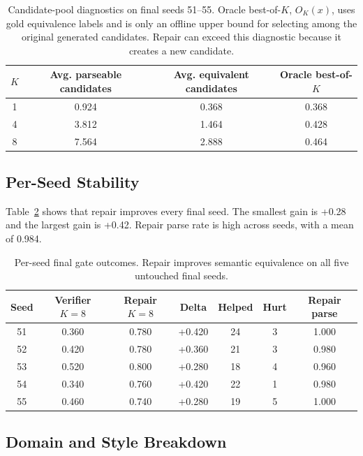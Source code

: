 \documentclass[11pt]{article}
\begin{document}
\begin{table}[t]
\centering
\small
\begin{tabular}{cccc}
\toprule
$K$ & Avg. parseable candidates & Avg. equivalent candidates & Oracle best-of-$K$ \\
\midrule
1 & 0.924 & 0.368 & 0.368 \\
4 & 3.812 & 1.464 & 0.428 \\
8 & 7.564 & 2.888 & 0.464 \\
\bottomrule
\end{tabular}
\caption{Candidate-pool diagnostics on final seeds 51--55. Oracle best-of-$K$,
\(O_K(x)\), uses gold equivalence labels and is only an offline upper bound for
selecting among the original generated candidates. Repair can exceed this
diagnostic because it creates a new candidate.}
\label{tab:oracle}
\end{table}

\subsection{Per-Seed Stability}

Table~\ref{tab:perseed} shows that repair improves every final seed. The
smallest gain is +0.28 and the largest gain is +0.42. Repair parse rate is high
across seeds, with a mean of 0.984.

\begin{table}[t]
\centering
\small
\begin{tabular}{ccccccc}
\toprule
Seed & Verifier $K=8$ & Repair $K=8$ & Delta & Helped & Hurt & Repair parse \\
\midrule
51 & 0.360 & 0.780 & +0.420 & 24 & 3 & 1.000 \\
52 & 0.420 & 0.780 & +0.360 & 21 & 3 & 0.980 \\
53 & 0.520 & 0.800 & +0.280 & 18 & 4 & 0.960 \\
54 & 0.340 & 0.760 & +0.420 & 22 & 1 & 0.980 \\
55 & 0.460 & 0.740 & +0.280 & 19 & 5 & 1.000 \\
\bottomrule
\end{tabular}
\caption{Per-seed final gate outcomes. Repair improves semantic equivalence on
all five untouched final seeds.}
\label{tab:perseed}
\end{table}

\subsection{Domain and Style Breakdown}
\end{document}
